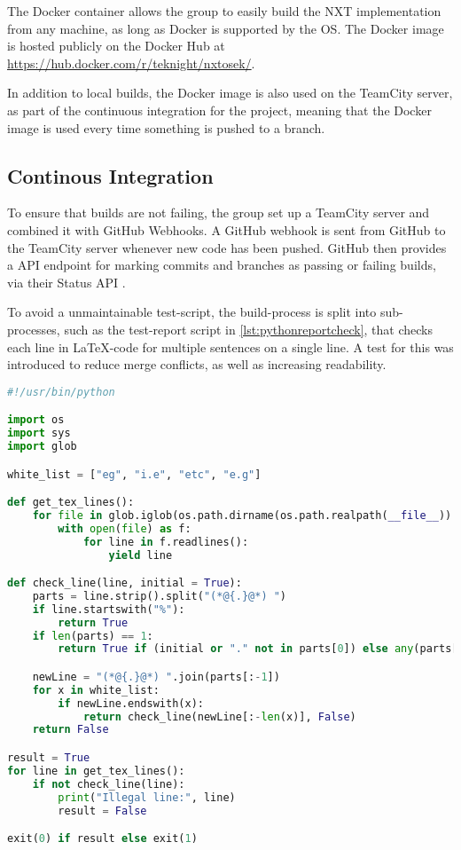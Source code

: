 The Docker container allows the group to easily build the NXT implementation from any machine, as long as Docker is supported by the OS.
The Docker image is hosted publicly on the Docker Hub at \url{https://hub.docker.com/r/teknight/nxtosek/}.

In addition to local builds, the Docker image is also used on the TeamCity server, as part of the continuous integration for the project, meaning that the Docker image is used every time something is pushed to a branch.

\subsection{Continous Integration}
To ensure that builds are not failing, the group set up a TeamCity server\cite{TeamCityHomepage} and combined it with GitHub Webhooks.
A GitHub webhook is sent from GitHub to the TeamCity server whenever new code has been pushed.
GitHub then provides a API endpoint for marking commits and branches as passing or failing builds, via their Status API \cite{GithubStatusAPI}.


To avoid a unmaintainable test-script, the build-process is split into sub-processes, such as the test-report script in \autoref{lst:pythonreportcheck}, that checks each line in \LaTeX{}-code for multiple sentences on a single line.
A test for this was introduced to reduce merge conflicts, as well as increasing readability.

\begin{lstlisting}[language=python,label={lst:pythonreportcheck},caption={Checking .tex files}]
#!/usr/bin/python

import os
import sys
import glob

white_list = ["eg", "i.e", "etc", "e.g"]

def get_tex_lines():
    for file in glob.iglob(os.path.dirname(os.path.realpath(__file__)) + '/report/*/**/*.tex', recursive=True):
        with open(file) as f:
            for line in f.readlines():
                yield line

def check_line(line, initial = True):
    parts = line.strip().split("(*@{.}@*) ")
    if line.startswith("%"):
        return True
    if len(parts) == 1:
        return True if (initial or "." not in parts[0]) else any(parts[0][:-1].endswith(x) for x in white_list)

    newLine = "(*@{.}@*) ".join(parts[:-1])
    for x in white_list:
        if newLine.endswith(x):
            return check_line(newLine[:-len(x)], False)
    return False

result = True
for line in get_tex_lines():
    if not check_line(line):
        print("Illegal line:", line)
        result = False

exit(0) if result else exit(1)
\end{lstlisting}


